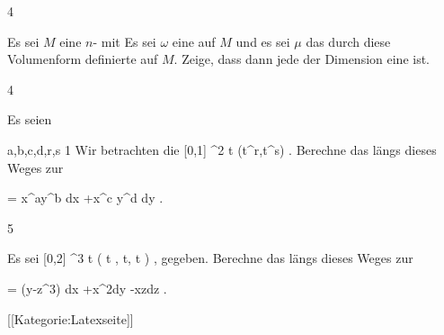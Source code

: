 
{4}
{

Es sei $M$ eine
$n$-
mit
Es sei $\omega$ eine
 auf $M$ und es sei $\mu$ das durch diese Volumenform definierte
 auf $M$. Zeige, dass dann jede
 der Dimension
 eine
ist.

}
{} {}

{4}
{

Es seien

\mavergleichskette
{\vergleichskette
{a,b,c,d,r,s
}
{ \geq }{ 1
}
{  }{
}
{    }{
}
{   }{
}
}
{}{}{}
Wir betrachten die
\maabbeledisp {} { [0,1] } {\R^2
} { t } {(t^r,t^s)
} {.}
Berechne das
längs dieses Weges zur

\mavergleichskette
{\vergleichskette
{ \omega
}
{ = }{ x^ay^b dx +x^c y^d dy
}
{  }{
}
{    }{
}
{   }{
}
}
{}{}{.}

}
{} {}

{5}
{

Es sei
\maabbeledisp {\gamma} { [0,2\pi] } {\R^3
} { t } {( \cos  t , \sin  t, t )
} {,}
gegeben. Berechne das
längs dieses Weges zur

\mavergleichskette
{\vergleichskette
{ \omega
}
{ = }{ (y-z^3) dx +x^2dy -xzdz
}
{  }{
}
{    }{
}
{   }{
}
}
{}{}{.}

}
{} {}

 [[Kategorie:Latexseite]]
